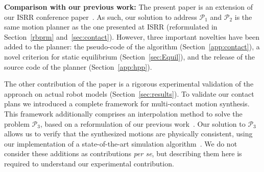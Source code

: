\documentclass[journal]{IEEEtran}
\providecommand{\DIFaddtex}[1]{#1} %
\providecommand{\DIFdeltex}[1]{} %
\providecommand{\DIFaddbegin}{\protect\color{blue}} %
\providecommand{\DIFaddend}{\protect\color{black}} %
\providecommand{\DIFdelbegin}{\protect\cbdelete} %
\providecommand{\DIFdelend}{} %
\providecommand{\DIFadd}[1]{\texorpdfstring{\DIFaddtex{#1}}{#1}} %
\providecommand{\DIFdel}[1]{\texorpdfstring{\DIFdeltex{#1}}{}} %
\begin{document}
\DIFdelbegin \DIFdel{The paper extends our previous papers presenting the reachability condition~\cite{tonneauisrr15}and the connection of our contact planner with a solver~$\mathcal{P}_3$~\cite{Carpentier2016}}\DIFdelend \DIFaddbegin \noindent \DIFadd{\textbf{Comparison with our previous work:}
The present paper is an extension of our ISRR conference paper~\cite{tonneauisrr15}. 
As such, our solution to address $\mathcal{P}_1$ and $\mathcal{P}_2$ is the same motion planner as the one presented at ISRR (reformulated in Section~\ref{rbprm} and~\ref{sec:contact})}\DIFaddend . 
\DIFdelbegin \DIFdel{we introduce a new efficient criterion of the robot balance, provide the complete }\DIFdelend \DIFaddbegin \DIFadd{However, three important novelties have been added to the planner: the }\DIFaddend pseudo-code \DIFdelbegin \DIFdel{and release our source code that can be used to directly reproduce our results. We also provide a }\DIFdelend \DIFaddbegin \DIFadd{of the algorithm  (Section~\ref{app:contact}), a novel criterion for
static equilibrium (Section~\ref{sec:Equil}), and the release of the source code of the planner (Section~\ref{app:hpp}).
}

\DIFadd{The other contribution of the paper is a rigorous experimental validation of the approach on actual robot models (Section~\ref{sec:results}).
To validate our contact plans we introduced a complete framework for multi-contact motion synthesis. This framework additionally comprises an interpolation method to solve the problem $\mathcal{P}_3$,  based on a reformulation of our previous work~\cite{Carpentier2016}. Our }\DIFaddend solution to $\mathcal{P}_3$ \DIFdelbegin \DIFdel{.
The planner is validated on robot models of HyQ and HRP-2 (while \cite{tonneauisrr15} used unrealistic avatar models) with complete performance analysis.
}\DIFdelend \DIFaddbegin \DIFadd{allows us to verify that the synthesized motions are physically consistent, using our implementation of a state-of-the-art simulation algorithm~\cite{Kaufman2008}. 
We do not consider these additions as contributions \textit{per se}, but describing them here is required to understand our experimental contribution.
}\DIFaddend 
\end{document}
